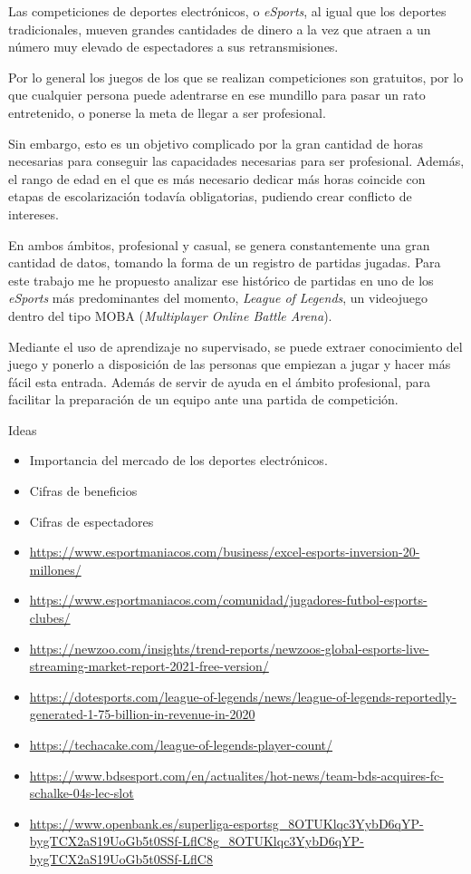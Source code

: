 
Las competiciones de deportes electrónicos, o \textit{eSports}, al igual que los deportes tradicionales, mueven grandes cantidades de dinero a la vez que atraen a un número muy elevado de espectadores a sus retransmisiones.

Por lo general los juegos de los que se realizan competiciones son gratuitos, por lo que cualquier persona puede adentrarse en ese mundillo para pasar un rato entretenido, o ponerse la meta de llegar a ser profesional.

Sin embargo, esto es un objetivo complicado por la gran cantidad de horas necesarias para conseguir las capacidades necesarias para ser profesional. Además, el rango de edad en el que es más necesario dedicar más horas coincide con etapas de escolarización todavía obligatorias, pudiendo crear conflicto de intereses.

En ambos ámbitos, profesional y casual, se genera constantemente una gran cantidad de datos, tomando la forma de un registro de partidas jugadas. Para este trabajo me he propuesto analizar ese histórico de partidas en uno de los \textit{eSports} más predominantes del momento, \textit{League of Legends}, un videojuego dentro del tipo MOBA (\textit{Multiplayer Online Battle Arena}).

Mediante el uso de aprendizaje no supervisado, se puede extraer conocimiento del juego y ponerlo a disposición de las personas que empiezan a jugar y hacer más fácil esta entrada. Además de servir de ayuda en el ámbito profesional, para facilitar la preparación de un equipo ante una partida de competición.

\hfill \break
Ideas
\begin{itemize}
    \item Importancia del mercado de los deportes electrónicos.
    \item Cifras de beneficios
    \item Cifras de espectadores
    \item \url{https://www.esportmaniacos.com/business/excel-esports-inversion-20-millones/}
    \item \url{https://www.esportmaniacos.com/comunidad/jugadores-futbol-esports-clubes/}
    \item \url{https://newzoo.com/insights/trend-reports/newzoos-global-esports-live-streaming-market-report-2021-free-version/}
    \item \url{https://dotesports.com/league-of-legends/news/league-of-legends-reportedly-generated-1-75-billion-in-revenue-in-2020}
    \item \url{https://techacake.com/league-of-legends-player-count/}
    \item \url{https://www.bdsesport.com/en/actualites/hot-news/team-bds-acquires-fc-schalke-04s-lec-slot}
    \item \url{https://www.openbank.es/superliga-esportsg_8OTUKlqc3YybD6qYP-bygTCX2aS19UoGb5t0SSf-LflC8g_8OTUKlqc3YybD6qYP-bygTCX2aS19UoGb5t0SSf-LflC8}
\end{itemize}